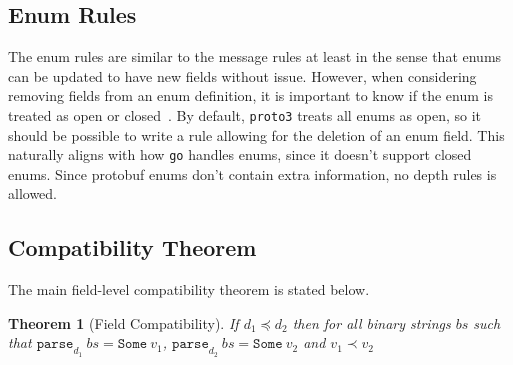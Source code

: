 \documentclass[11pt]{article}
\theoremstyle{definition}
\theoremstyle{plain}
\newtheorem{theorem}{Theorem}
\begin{document}
\begin{mathpar}


  \hspace{1cm}
\end{mathpar}

\subsection{Enum Rules}

The enum rules are similar to the message rules at least in the sense that enums
can be updated to have new fields without issue. However, when considering
removing fields from an enum definition, it is important to know if the enum is
treated as open or closed~\cite{EnumBehavior}. By default, \texttt{proto3}
treats all enums as open, so it should be possible to write a rule allowing for
the deletion of an enum field. This naturally aligns with how \texttt{go}
handles enums, since it doesn't support closed enums. Since protobuf enums don't
contain extra information, no depth rules is allowed.

\begin{mathpar}

\end{mathpar}

\subsection{Compatibility Theorem}

The main field-level compatibility theorem is stated below.
\\
\begin{theorem}[Field Compatibility]
  If $d_1 \preceq d_2$ then for all binary strings $bs$ such that
  $\mathtt{parse}_{d_1}\ bs = \mathtt{Some}\ v_1$, $\mathtt{parse}_{d_2}\ bs =
  \mathtt{Some}\ v_2$ and $v_1 \prec v_2$
\end{theorem}
\end{document}
